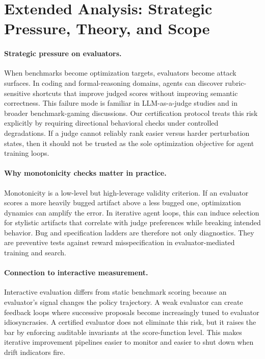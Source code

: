 \section{Extended Analysis: Strategic Pressure, Theory, and Scope}

\paragraph{Strategic pressure on evaluators.}
When benchmarks become optimization targets, evaluators become attack surfaces.
In coding and formal-reasoning domains, agents can discover rubric-sensitive shortcuts that improve judged scores without improving semantic correctness.
This failure mode is familiar in LLM-as-a-judge studies and in broader benchmark-gaming discussions.
Our certification protocol treats this risk explicitly by requiring directional behavioral checks under controlled degradations.
If a judge cannot reliably rank easier versus harder perturbation states, then it should not be trusted as the sole optimization objective for agent training loops.

\paragraph{Why monotonicity checks matter in practice.}
Monotonicity is a low-level but high-leverage validity criterion.
If an evaluator scores a more heavily bugged artifact above a less bugged one, optimization dynamics can amplify the error.
In iterative agent loops, this can induce selection for stylistic artifacts that correlate with judge preferences while breaking intended behavior.
Bug and specification ladders are therefore not only diagnostics.
They are preventive tests against reward misspecification in evaluator-mediated training and search.

\paragraph{Connection to interactive measurement.}
Interactive evaluation differs from static benchmark scoring because an evaluator's signal changes the policy trajectory.
A weak evaluator can create feedback loops where successive proposals become increasingly tuned to evaluator idiosyncrasies.
A certified evaluator does not eliminate this risk, but it raises the bar by enforcing auditable invariants at the score-function level.
This makes iterative improvement pipelines easier to monitor and easier to shut down when drift indicators fire.


